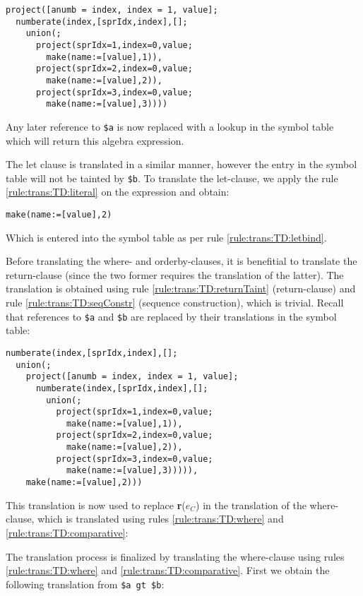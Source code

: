 \begin{Verbatim}
project([anumb = index, index = 1, value];
  numberate(index,[sprIdx,index],[];
    union(;
      project(sprIdx=1,index=0,value;
        make(name:=[value],1)),
      project(sprIdx=2,index=0,value;
        make(name:=[value],2)),
      project(sprIdx=3,index=0,value;
        make(name:=[value],3))))
\end{Verbatim}

Any later reference to \texttt{\$a} is now replaced with a lookup in the symbol
table which will return this algebra expression.

The let clause is translated in a similar manner, however the entry in the
symbol table will not be tainted by \texttt{\$b}. To translate the let-clause,
we apply the rule \ref{rule:trans:TD:literal} on the expression and obtain:

\begin{Verbatim}
make(name:=[value],2)
\end{Verbatim}

Which is entered into the symbol table as per rule \ref{rule:trans:TD:letbind}.

Before translating the where- and orderby-clauses, it is benefitial to
translate the return-clause (since the two former requires the translation of
the latter). The translation is obtained using rule
\ref{rule:trans:TD:returnTaint} (return-clause) and rule
\ref{rule:trans:TD:seqConstr} (sequence construction), which is trivial. Recall
that references to \texttt{\$a} and \texttt{\$b} are replaced by their
translations in the symbol table:

\begin{Verbatim}
numberate(index,[sprIdx,index],[];
  union(;
    project([anumb = index, index = 1, value];
      numberate(index,[sprIdx,index],[];
        union(;
          project(sprIdx=1,index=0,value;
            make(name:=[value],1)),
          project(sprIdx=2,index=0,value;
            make(name:=[value],2)),
          project(sprIdx=3,index=0,value;
            make(name:=[value],3))))),
    make(name:=[value],2)))
\end{Verbatim}

This translation is now used to replace \textbf{r}($e_C$) in the translation
of the where-clause, which is translated using rules \ref{rule:trans:TD:where}
and \ref{rule:trans:TD:comparative}:

The translation process is finalized by translating the where-clause using rules
\ref{rule:trans:TD:where} and \ref{rule:trans:TD:comparative}. First we
obtain the following translation from \texttt{\$a gt \$b}:

